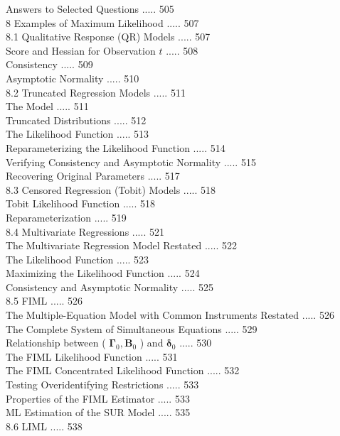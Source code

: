 \documentclass[10pt]{article}
\begin{document}
Answers to Selected Questions ..... 505\\
8 Examples of Maximum Likelihood ..... 507\\
8.1 Qualitative Response (QR) Models ..... 507\\
Score and Hessian for Observation $t$ ..... 508\\
Consistency ..... 509\\
Asymptotic Normality ..... 510\\
8.2 Truncated Regression Models ..... 511\\
The Model ..... 511\\
Truncated Distributions ..... 512\\
The Likelihood Function ..... 513\\
Reparameterizing the Likelihood Function ..... 514\\
Verifying Consistency and Asymptotic Normality ..... 515\\
Recovering Original Parameters ..... 517\\
8.3 Censored Regression (Tobit) Models ..... 518\\
Tobit Likelihood Function ..... 518\\
Reparameterization ..... 519\\
8.4 Multivariate Regressions ..... 521\\
The Multivariate Regression Model Restated ..... 522\\
The Likelihood Function ..... 523\\
Maximizing the Likelihood Function ..... 524\\
Consistency and Asymptotic Normality ..... 525\\
8.5 FIML ..... 526\\
The Multiple-Equation Model with Common Instruments Restated ..... 526\\
The Complete System of Simultaneous Equations ..... 529\\
Relationship between ( $\boldsymbol{\Gamma}_{0}, \mathbf{B}_{0}$ ) and $\boldsymbol{\delta}_{0}$ ..... 530\\
The FIML Likelihood Function ..... 531\\
The FIML Concentrated Likelihood Function ..... 532\\
Testing Overidentifying Restrictions ..... 533\\
Properties of the FIML Estimator ..... 533\\
ML Estimation of the SUR Model ..... 535\\
8.6 LIML ..... 538\\
\end{document}
